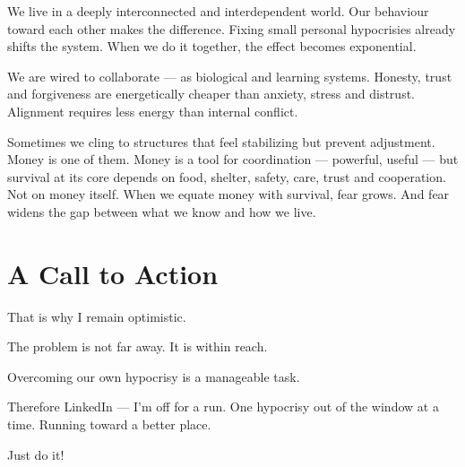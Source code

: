 \documentclass{article}
\begin{document}
We live in a deeply interconnected and interdependent world. Our behaviour toward each other makes the difference. Fixing small personal hypocrisies already shifts the system. When we do it together, the effect becomes exponential.

We are wired to collaborate — as biological and learning systems. Honesty, trust and forgiveness are energetically cheaper than anxiety, stress and distrust. Alignment requires less energy than internal conflict.

Sometimes we cling to structures that feel stabilizing but prevent adjustment. Money is one of them. Money is a tool for coordination — powerful, useful — but survival at its core depends on food, shelter, safety, care, trust and cooperation. Not on money itself. When we equate money with survival, fear grows. And fear widens the gap between what we know and how we live.

\section*{A Call to Action}

That is why I remain optimistic.

The problem is not far away. It is within reach.

Overcoming our own hypocrisy is a manageable task.

Therefore LinkedIn — I’m off for a run.
One hypocrisy out of the window at a time.
Running toward a better place.

Just do it!
\end{document}
